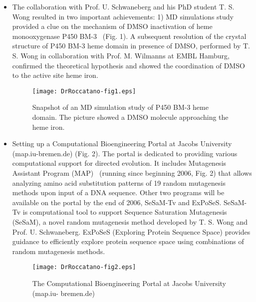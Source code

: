 \begin{itemize}
 
\item{} The  collaboration with Prof. U. Schwaneberg and his PhD student T. S.
Wong resulted in two important achievements: 1) MD simulations study provided a clue on 
the mechanism of DMSO inactivation of heme monooxygenase P450 BM-3~\cite{Roccatano06a} (Fig. 1).  A subsequent 
resolution of the crystal structure of P450 BM-3 heme domain in 
presence of DMSO, performed by T. S. Wong in 
collaboration with Prof. M. Wilmanns at EMBL Hamburg, confirmed 
the theoretical hypothesis and showed the 
coordination of DMSO to the active site heme iron. 

\begin{figure}[ht]
  \begin{center}
    \texttt{[image: DrRoccatano-fig1.eps]}
    \caption{ Snapshot of an MD simulation study of P450 BM-3 heme domain. The picture showed a DMSO molecule approaching the heme iron. }\label{fig:Roccatano1}
   \end{center}
\end{figure}

\item{}  Setting up a Computational Bioengineering Portal at Jacobs University (map.iu-bremen.de) (Fig. 2). 
The portal is dedicated to providing various computational 
support for directed evolution. It includes Mutagenesis Assistant Program (MAP)~\cite{Wong06,Schenk06} 
(running since beginning 2006, Fig. 2) that allows analyzing amino acid substitution patterns of 19 random mutagenesis methods upon input of a DNA sequence. Other two programs will be
available on the portal by the end of 2006, SeSaM-Tv and ExPoSeS. SeSaM-Tv is computational tool
to support Sequence Saturation Mutagenesis (SeSaM), a novel random mutagenesis method developed by T. S. Wong and Prof. U. Schwaneberg. ExPoSeS (Exploring Protein Sequence Space) provides guidance to efficiently explore protein sequence space using combinations of random mutagenesis methods.   

\begin{figure}[ht]
  \begin{center}
    \texttt{[image: DrRoccatano-fig2.eps]}
    \caption{The Computational Bioengineering Portal at Jacobs University (map.iu-
bremen.de)}\label{fig:Roccatano2}
   \end{center}
\end{figure}


\end{itemize}

